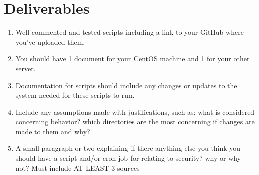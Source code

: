 \documentclass[12pt]{article}
\begin{document}
\section*{Deliverables}
\begin{enumerate}
    \item Well commented and tested scripts including a link to your GitHub where you've uploaded them.
    \item You should have 1 document for your CentOS machine and 1 for your other server.
    \item  Documentation for scripts should include any changes or updates to the system needed for these scripts to run.
    \item Include any assumptions made with justifications, such as: what is considered concerning behavior? which directories are the most concerning if changes are made to them and why?
    \item A small paragraph or two explaining if there anything else you think you should have a script and/or cron job for relating to security?  why or why not?  Must include AT LEAST 3 sources

\end{enumerate}    
\end{document}
